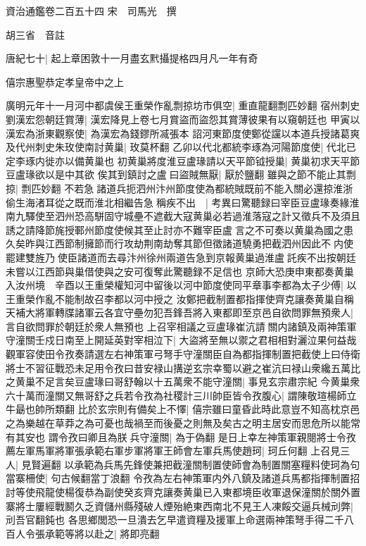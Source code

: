 資治通鑑卷二百五十四
宋　司馬光　撰

胡三省　音註

唐紀七十|{
	起上章困敦十一月盡玄黓攝提格四月凡一年有奇}


僖宗惠聖恭定孝皇帝中之上

廣明元年十一月河中都虞侯王重榮作亂剽掠坊市俱空|{
	重直龍翻剽匹妙翻}
宿州刺史劉漢宏怨朝廷賞薄|{
	漢宏降見上卷七月賞盜而盜怨其賞薄彼果有以窺朝廷也}
甲寅以漢宏為浙東觀察使|{
	為漢宏為錢鏐所㓕張本}
詔河東節度使鄭從讜以本道兵授諸葛爽及代州刺史朱玫使南討黄巢|{
	玫莫杯翻}
乙卯以代北都統李琢為河陽節度使|{
	代北已定李琢内徙亦以備黄巢也}
初黄巢將度淮豆盧瑑請以天平節钺授巢|{
	黄巢初求天平節豆盧瑑欲以是中其欲}
俟其到鎮討之盧曰盜賊無厭|{
	厭於鹽翻}
雖與之節不能止其剽掠|{
	剽匹妙翻}
不若急諸道兵扼泗州汴州節度使為都統賊既前不能入關必還掠淮浙偷生海渚耳從之既而淮北相繼告急稱疾不出　|{
	考異曰驚聽録曰宰臣豆盧瑑奏緣淮南九驛使至泗州恐高駢固守城壘不遮截大寇黄巢必若過淮落寇之計又徵兵不及須且誘之請降節旄授鄆州節度使候其至止討亦不難宰臣盧言之不可奏以黄巢為國之患久矣昨與江西節制擁節而行攻劫荆南劫奪其節但徵諸道驍勇把截泗州因此不内使罷建雙旌乃使臣諸道而去尋汴州徐州兩道告急到京報黄巢過淮盧託疾不出按朝廷未嘗以江西節與巢借使與之安可復奪此驚聽録不足信也}
京師大恐庚申東都奏黄巢入汝州境　辛酉以王重榮權知河中留後以河中節度使同平章事李都為太子少傅|{
	以王重榮作亂不能制故召李都以河中授之}
汝鄭把截制置都指揮使齊克讓奏黄巢自稱天補大將軍轉牒諸軍云各宜守壘勿犯吾鋒吾將入東都即至京邑自欲問罪無預衆人|{
	言自欲問罪於朝廷於衆人無預也}
上召宰相議之豆盧瑑崔沆請關内諸鎮及兩神策軍守潼關壬戍日南至上開延英對宰相泣下|{
	大盜將至無以禦之君相相對灑泣果何益哉}
觀軍容使田令孜奏請選左右神策軍弓弩手守潼關臣自為都指揮制置把截使上曰侍衛將士不習征戰恐未足用令孜曰昔安禄山搆逆玄宗幸蜀以避之崔沆曰禄山衆纔五萬比之黄巢不足言矣豆盧瑑曰哥舒翰以十五萬衆不能守潼關|{
	事見玄宗肅宗紀}
今黄巢衆六十萬而潼關又無哥舒之兵若令孜為社稷計三川帥臣皆令孜腹心|{
	謂陳敬瑄楊師立牛朂也帥所類翻}
比於玄宗則有備矣上不懌|{
	僖宗雖曰童昏此時此意豈不知高枕京邑之為樂越在草莽之為可憂也哉禍至而後憂之則無及矣古之明主居安而思危所以能常有其安也}
謂令孜曰卿且為朕兵守潼關|{
	為于偽翻}
是日上幸左神策軍親閱將士令孜薦左軍馬軍將軍張承範右軍步軍將軍王師會左軍兵馬使趙珂|{
	珂丘何翻}
上召見三人|{
	見賢遍翻}
以承範為兵馬先鋒使兼把截潼關制置使師會為制置關塞糧料使珂為句當寨柵使|{
	句古候翻當丁浪翻}
令孜為左右神策軍内外八鎮及諸道兵馬都指揮制置招討等使飛龍使楊復恭為副使癸亥齊克讓奏黄巢已入東都境臣收軍退保潼關於關外置寨將士屢經戰鬭久乏資儲州縣殘破人煙殆絶東西南北不見王人凍餒交逼兵械刓弊|{
	刓吾官翻鈍也}
各思鄉閭恐一旦潰去乞早遣資糧及援軍上命選兩神策弩手得二千八百人令張承範等將以赴之|{
	將即亮翻}
